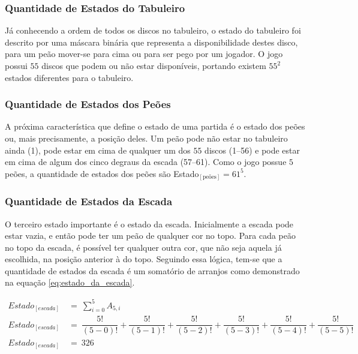 \subsubsection{Quantidade de Estados do Tabuleiro}

Já conhecendo a ordem de todos os discos no tabuleiro, o estado do tabuleiro foi descrito por uma máscara binária que representa a disponibilidade destes disco, para um peão mover-se para cima ou para ser pego por um jogador. O jogo possui $55$ discos que podem ou não estar disponíveis, portando existem $55^2$ estados diferentes para o tabuleiro.

\subsubsection{Quantidade de Estados dos Peões}

A próxima característica que define o estado de uma partida é o estado dos peões ou, mais precisamente, a posição deles. Um peão pode não estar no tabuleiro ainda (1), pode estar em cima de qualquer um dos $55$ discos (1--56) e pode estar em cima de algum dos cinco degraus da escada (57--61). Como o jogo possue $5$ peões, a quantidade de estados dos peões são Estado$_{[\text{peões}]}=61^5$.

\subsubsection{Quantidade de Estados da Escada}

O terceiro estado importante é o estado da escada. Inicialmente a escada pode estar vazia, e então pode ter um peão de qualquer cor no topo. Para cada peão no topo da escada, é possível ter qualquer outra cor, que não seja aquela já escolhida, na posição anterior à do topo. Seguindo essa lógica, tem-se que a quantidade de estados da escada é um somatório de arranjos como demonstrado na equação \ref{eq:estado_da_escada}.

\begin{equation} \label{eq:estado_da_escada} \tag{e.q. Estado da escada}
\begin{split}
	Estado_{[escada]}\ &=\ \displaystyle\sum_{i=0}^{5} A_{5,i}\\
	Estado_{[escada]}\ &=\ \dfrac{5!}{(5-0)!} + \dfrac{5!}{(5-1)!} + \dfrac{5!}{(5-2)!} + \dfrac{5!}{(5-3)!} + \dfrac{5!}{(5-4)!} + \dfrac{5!}{(5-5)!}\\
	Estado_{[escada]}\ &=\ 326
\end{split}
\end{equation}

